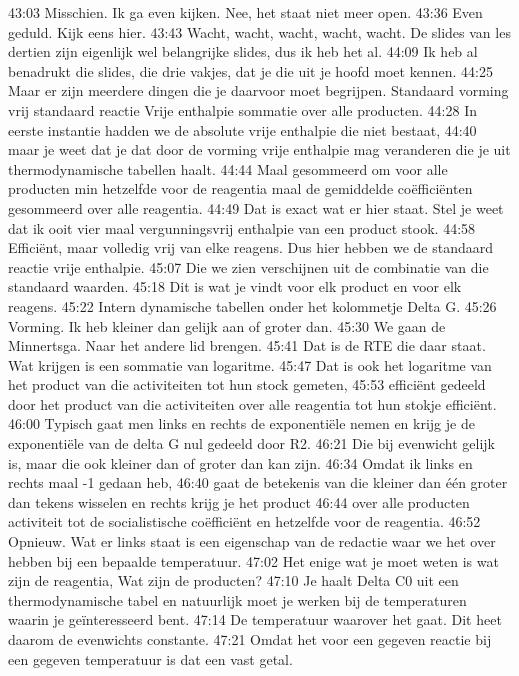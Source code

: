 43:03
Misschien. Ik ga even kijken. Nee, het staat niet meer open.
43:36
Even geduld. Kijk eens hier.
43:43
Wacht, wacht, wacht, wacht, wacht. De slides van les dertien zijn eigenlijk wel belangrijke slides, dus ik heb het al.
44:09
Ik heb al benadrukt die slides, die drie vakjes, dat je die uit je hoofd moet kennen.
44:25
Maar er zijn meerdere dingen die je daarvoor moet begrijpen. Standaard vorming vrij standaard reactie Vrije enthalpie sommatie over alle producten.
44:28
In eerste instantie hadden we de absolute vrije enthalpie die niet bestaat,
44:40
maar je weet dat je dat door de vorming vrije enthalpie mag veranderen die je uit thermodynamische tabellen haalt.
44:44
Maal gesommeerd om voor alle producten min hetzelfde voor de reagentia maal de gemiddelde coëfficiënten gesommeerd over alle reagentia.
44:49
Dat is exact wat er hier staat. Stel je weet dat ik ooit vier maal vergunningsvrij enthalpie van een product stook.
44:58
Efficiënt, maar volledig vrij van elke reagens. Dus hier hebben we de standaard reactie vrije enthalpie.
45:07
Die we zien verschijnen uit de combinatie van die standaard waarden.
45:18
Dit is wat je vindt voor elk product en voor elk reagens.
45:22
Intern dynamische tabellen onder het kolommetje Delta G.
45:26
Vorming. Ik heb kleiner dan gelijk aan of groter dan.
45:30
We gaan de Minnertsga. Naar het andere lid brengen.
45:41
Dat is de RTE die daar staat. Wat krijgen is een sommatie van logaritme.
45:47
Dat is ook het logaritme van het product van die activiteiten tot hun stock gemeten,
45:53
efficiënt gedeeld door het product van die activiteiten over alle reagentia tot hun stokje efficiënt.
46:00
Typisch gaat men links en rechts de exponentiële nemen en krijg je de exponentiële van de delta G nul gedeeld door R2.
46:21
Die bij evenwicht gelijk is, maar die ook kleiner dan of groter dan kan zijn.
46:34
Omdat ik links en rechts maal -1 gedaan heb,
46:40
gaat de betekenis van die kleiner dan één groter dan tekens wisselen en rechts krijg je het product
46:44
over alle producten activiteit tot de socialistische coëfficiënt en hetzelfde voor de reagentia.
46:52
Opnieuw. Wat er links staat is een eigenschap van de redactie waar we het over hebben bij een bepaalde temperatuur.
47:02
Het enige wat je moet weten is wat zijn de reagentia, Wat zijn de producten?
47:10
Je haalt Delta C0 uit een thermodynamische tabel en natuurlijk moet je werken bij de temperaturen waarin je geïnteresseerd bent.
47:14
De temperatuur waarover het gaat. Dit heet daarom de evenwichts constante.
47:21
Omdat het voor een gegeven reactie bij een gegeven temperatuur is dat een vast getal.
